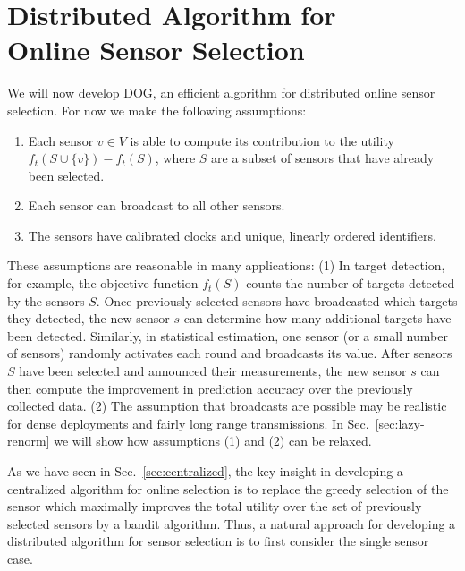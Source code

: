 \documentclass{sig-alternate-dan}
\numberwithin{equation}{section}
\newcommand{\algofont}[1]{\textsc{#1}}
\newcommand{\algoname}{{\algofont{DOG}}\xspace}
\newcommand{\sensor}{\ensuremath{v}}
\newcommand{\sensors}{V}
\newcommand{\obj}{\ensuremath{f}} %
\newcommand{\secref}[1]{Sec.~\ref{#1}}
\newcommand{\denselist}{
    \itemsep -3pt\topsep-8pt\partopsep-8pt
}
\begin{document}
%
%
%
%
%
%



\section{Distributed Algorithm for \\Online Sensor Selection}\label{sec:distributed}

We will now develop \algoname, an efficient algorithm for distributed
online sensor selection.  For now we make the following assumptions:
%

\begin{enumerate}\denselist
\item Each sensor $\sensor \in \sensors$ is able to compute its
contribution to the utility $\obj_{t}(S\cup \{\sensor\})-\obj_{t}(S)$,
where $S$ are a subset of sensors that have already been selected.
\item Each sensor can broadcast  to all other sensors.
\item The sensors have calibrated clocks and unique, linearly ordered identifiers.
\end{enumerate}

These assumptions are reasonable in many applications: (1) In target
detection, for example, the objective function $\obj_{t}(S)$ counts
the number of targets detected by the sensors $S$.  Once previously
selected sensors have broadcasted which targets they detected, the new
sensor $s$ can determine how many additional targets have been
detected.  Similarly, in statistical estimation, one sensor (or a
small number of sensors) randomly activates each round and broadcasts
its value. After sensors $S$ have been selected and announced their
measurements, the new sensor $s$ can then compute the improvement in
prediction accuracy over the previously collected data. (2) The
assumption that broadcasts are possible may be realistic for dense
deployments and fairly long range transmissions.  In
\secref{sec:lazy-renorm} we will show how assumptions (1) and (2) can
be relaxed.

As we have seen in \secref{sec:centralized}, the key insight in
developing a centralized algorithm for online selection is to replace
the greedy selection of the sensor which maximally improves the total
utility over the set of previously selected sensors by a bandit
algorithm.  Thus, a natural approach for developing a distributed
algorithm for sensor selection is to first consider the single sensor
case.
\end{document}
